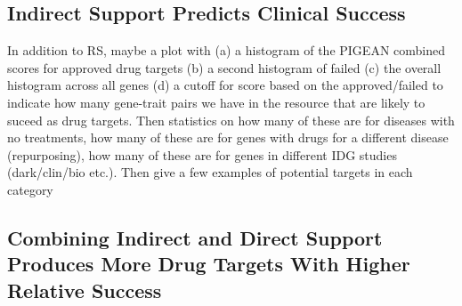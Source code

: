 \subsection{Indirect Support Predicts Clinical Success}

In addition to RS, maybe a plot with (a) a histogram of the PIGEAN combined scores for approved drug targets (b) a second histogram of failed (c) the overall histogram across all genes (d) a cutoff for score based on the approved/failed to indicate how many gene-trait pairs we have in the resource that are likely to suceed as drug targets. Then statistics on how many of these are for diseases with no treatments, how many of these are for genes with drugs for a different disease (repurposing), how many of these are for genes in different IDG studies (dark/clin/bio etc.). Then give a few examples of potential targets in each category

\subsection{Combining Indirect and Direct Support Produces More Drug Targets With Higher Relative Success}
